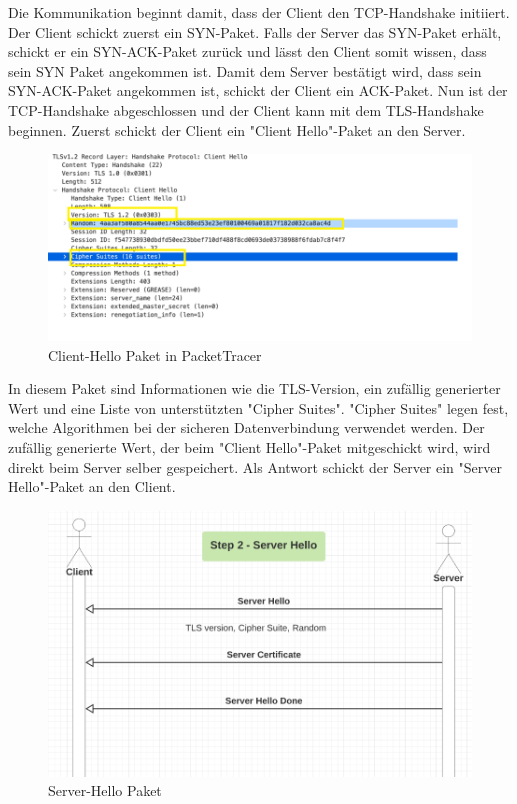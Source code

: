 Die Kommunikation beginnt damit, dass der Client den TCP-Handshake initiiert. Der Client schickt zuerst ein SYN-Paket. Falls der Server das SYN-Paket erhält, schickt er ein SYN-ACK-Paket zurück und lässt den Client somit wissen, dass sein SYN Paket angekommen ist. Damit dem Server bestätigt wird, dass sein SYN-ACK-Paket angekommen ist, schickt der Client ein ACK-Paket. Nun ist der TCP-Handshake abgeschlossen und der Client kann mit dem TLS-Handshake beginnen. Zuerst schickt der Client ein "Client Hello"-Paket an den Server.

\begin{figure}[H]
    \centering
    \includegraphics{media/OpenSSL/pt.png}
    \caption{Client-Hello Paket in PacketTracer \cite{DeepDiveTLS}}
\end{figure}

In diesem Paket sind Informationen wie die TLS-Version, ein zufällig generierter Wert und eine Liste von unterstützten "Cipher Suites". "Cipher Suites" legen fest, welche Algorithmen bei der sicheren Datenverbindung verwendet werden. Der zufällig generierte Wert, der beim "Client Hello"-Paket mitgeschickt wird, wird direkt beim Server selber gespeichert. Als Antwort schickt der Server ein "Server Hello"-Paket an den Client. 

\begin{figure}[H]
    \centering
    \includegraphics{media/OpenSSL/hello.png}
    \caption{Server-Hello Paket \cite{DeepDiveTLS}} 
\end{figure}

